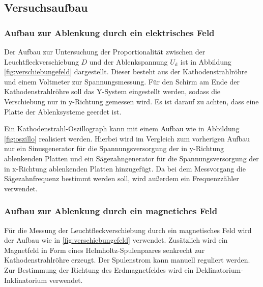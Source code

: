 \subsection{Versuchsaufbau}
\label{sec:Versuchsaufbau}
\subsubsection{Aufbau zur Ablenkung durch ein elektrisches Feld}
Der Aufbau zur Untersuchung der Proportionalität zwischen der Leuchtfleckverschiebung $D$ und 
der Ablenkspannung $U_{\mathrm{d}}$ ist in Abbildung \ref{fig:verschiebungefeld} dargestellt.
Dieser besteht aus der Kathodenstrahlröhre und einem Voltmeter zur Spannungsmessung. Für den 
Schirm am Ende der Kathodenstrahlröhre soll das Y-System eingestellt werden, sodass die 
Verschiebung nur in y-Richtung gemessen wird. Es ist darauf zu achten, dass eine Platte 
der Ablenksysteme geerdet ist.

Ein Kathodenstrahl-Oszillograph kann mit einem Aufbau wie in Abbildung \ref{fig:oszillo}
realisiert werden. Hierbei wird im Vergleich zum vorherigen Aufbau nur ein Sinusgenerator für 
die Spannungsversorgung der in y-Richtung ablenkenden Platten und ein Sägezahngenerator 
für die Spannungsversorgung der in x-Richtung ablenkenden Platten hinzugefügt. 
Da bei dem Messvorgang die Sägezahnfrequenz bestimmt werden soll, wird außerdem ein 
Frequenzzähler verwendet.

\subsubsection{Aufbau zur Ablenkung durch ein magnetiches Feld}
Für die Messung der Leuchtfleckverschiebung durch ein magnetisches Feld wird der Aufbau wie 
in \ref{fig:verschiebungefeld} verwendet. Zusätzlich wird ein Magnetfeld in Form eines 
Helmholtz-Spulenpaares senkrecht zur Kathodenstrahlröhre erzeugt. Der Spulenstrom kann manuell
reguliert werden.
Zur Bestimmung der Richtung des Erdmagnetfeldes wird ein Deklinatorium-Inklinatorium 
verwendet.
